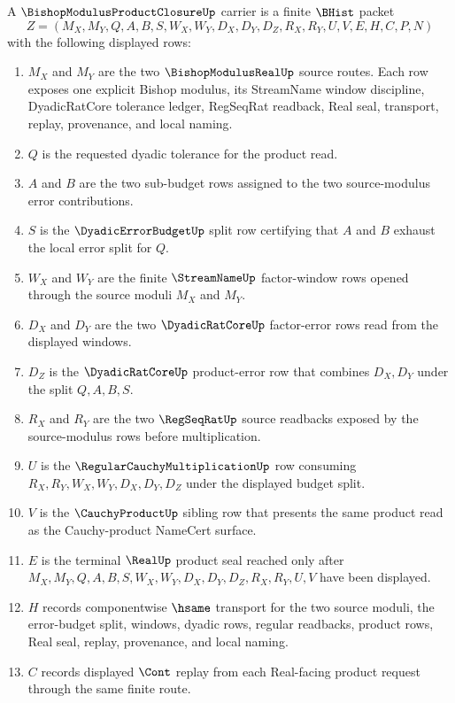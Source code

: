 \begin{definition}
\label{def:bishop-modulus-product-closure-carrier}
A $\BishopModulusProductClosureUp$ carrier is a finite $\BHist$ packet
$$
Z=(M_X,M_Y,Q,A,B,S,W_X,W_Y,D_X,D_Y,D_Z,R_X,R_Y,U,V,E,H,C,P,N)
$$
with the following displayed rows:
\begin{enumerate}
\item $M_X$ and $M_Y$ are the two $\BishopModulusRealUp$ source routes. Each row exposes one explicit Bishop modulus, its StreamName window discipline, DyadicRatCore tolerance ledger, RegSeqRat readback, Real seal, transport, replay, provenance, and local naming.
\item $Q$ is the requested dyadic tolerance for the product read.
\item $A$ and $B$ are the two sub-budget rows assigned to the two source-modulus error contributions.
\item $S$ is the $\DyadicErrorBudgetUp$ split row certifying that $A$ and $B$ exhaust the local error split for $Q$.
\item $W_X$ and $W_Y$ are the finite $\StreamNameUp$ factor-window rows opened through the source moduli $M_X$ and $M_Y$.
\item $D_X$ and $D_Y$ are the two $\DyadicRatCoreUp$ factor-error rows read from the displayed windows.
\item $D_Z$ is the $\DyadicRatCoreUp$ product-error row that combines $D_X,D_Y$ under the split $Q,A,B,S$.
\item $R_X$ and $R_Y$ are the two $\RegSeqRatUp$ source readbacks exposed by the source-modulus rows before multiplication.
\item $U$ is the $\RegularCauchyMultiplicationUp$ row consuming $R_X,R_Y,W_X,W_Y,D_X,D_Y,D_Z$ under the displayed budget split.
\item $V$ is the $\CauchyProductUp$ sibling row that presents the same product read as the Cauchy-product NameCert surface.
\item $E$ is the terminal $\RealUp$ product seal reached only after $M_X,M_Y,Q,A,B,S,W_X,W_Y,D_X,D_Y,D_Z,R_X,R_Y,U,V$ have been displayed.
\item $H$ records componentwise $\hsame$ transport for the two source moduli, the error-budget split, windows, dyadic rows, regular readbacks, product rows, Real seal, replay, provenance, and local naming.
\item $C$ records displayed $\Cont$ replay from each Real-facing product request through the same finite route.

\end{enumerate}
\end{definition}
